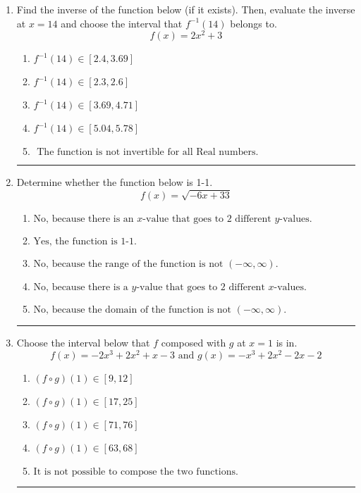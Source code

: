 \documentclass[14pt]{extbook}
\newcommand{\litem}[1]{\item#1\hspace*{-1cm}\rule{\textwidth}{0.4pt}}
\begin{document}
\begin{enumerate}
\litem{
Find the inverse of the function below (if it exists). Then, evaluate the inverse at $x = 14$ and choose the interval that $f^{-1}(14)$ belongs to.\[ f(x) = 2 x^2 + 3 \]\begin{enumerate}[label=\Alph*.]
\item \( f^{-1}(14) \in [2.4, 3.69] \)
\item \( f^{-1}(14) \in [2.3, 2.6] \)
\item \( f^{-1}(14) \in [3.69, 4.71] \)
\item \( f^{-1}(14) \in [5.04, 5.78] \)
\item \( \text{ The function is not invertible for all Real numbers. } \)

\end{enumerate} }
\litem{
Determine whether the function below is 1-1.\[ f(x) = \sqrt{-6 x + 33} \]\begin{enumerate}[label=\Alph*.]
\item \( \text{No, because there is an $x$-value that goes to 2 different $y$-values.} \)
\item \( \text{Yes, the function is 1-1.} \)
\item \( \text{No, because the range of the function is not $(-\infty, \infty)$.} \)
\item \( \text{No, because there is a $y$-value that goes to 2 different $x$-values.} \)
\item \( \text{No, because the domain of the function is not $(-\infty, \infty)$.} \)

\end{enumerate} }
\litem{
Choose the interval below that $f$ composed with $g$ at $x=1$ is in.\[ f(x) = -2x^{3} +2 x^{2} +x -3 \text{ and } g(x) = -x^{3} +2 x^{2} -2 x -2 \]\begin{enumerate}[label=\Alph*.]
\item \( (f \circ g)(1) \in [9, 12] \)
\item \( (f \circ g)(1) \in [17, 25] \)
\item \( (f \circ g)(1) \in [71, 76] \)
\item \( (f \circ g)(1) \in [63, 68] \)
\item \( \text{It is not possible to compose the two functions.} \)


\end{enumerate}}
\end{enumerate}
\end{document}
